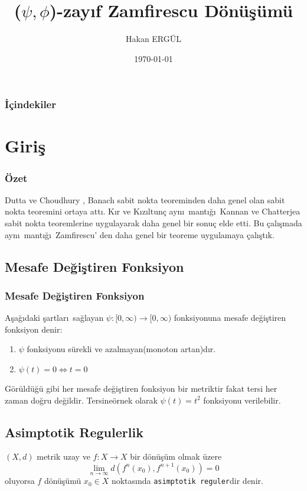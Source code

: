 \documentclass[8pt]{beamer}
\title{($\psi,\phi$)-zay\i f Zamfirescu D\"on\"u\c{s}\"um\"u}
\author{Hakan ERG\"UL}
\institute{Atat\"{u}rk \"{U}niversitesi}
\date{\today}
\begin{document}
\begin{frame}
\titlepage
\end{frame}
\begin{frame}
  \frametitle{\.{I}\c{c}indekiler}
  \tableofcontents
\end{frame}


\section{Giri\c{s}}
\begin{frame}
  \frametitle{\"Ozet}
  \textrm{Dutta ve Choudhury \cite{Dutta2008}, Banach sabit nokta teoreminden daha genel olan sabit nokta teoremini ortaya att\i . K\i r ve K\i z\i ltun\c{c} \cite{Kir2013} ayn\i \ mant\i \u{g}\i \ Kannan\cite{Kannan1969} ve Chatterjea\cite{Chatterjea1972} sabit nokta teoremlerine uygulayarak daha genel bir sonu\c{c} elde etti. Bu \c{c}al\i \c{s}mada ayn\i \ mant\i \u{g}\i \ Zamfirescu\cite{Zamfirescu1972}' den daha genel bir teoreme uygulamaya \c{c}al\i \c{s}t\i k.}
\end{frame}


\subsection{Mesafe De\u{g}i\c{s}tiren Fonksiyon}
\begin{frame}
\frametitle{Mesafe De\u{g}i\c{s}tiren Fonksiyon}
  \begin{definition}
     A\c{s}a\u{g}\i daki \c{s}artlar\i \ sa\u{g}layan $\psi:[0,\infty)\to[0,\infty)$ fonksiyonuna mesafe de\u{g}i\c{s}tiren fonksiyon denir:
     \begin{enumerate}
      \item $\psi$ fonksiyonu s\"urekli ve azalmayan(monoton artan)d\i r.
      \item $\psi(t)=0\Leftrightarrow t=0$
     \end{enumerate}
G\"or\"uld\"u\u{g}\"u gibi her mesafe de\u{g}i\c{s}tiren fonksiyon bir metriktir fakat tersi her zaman do\u{g}ru de\u{g}ildir. Tersine\"ornek olarak $\psi(t)=t^2$ fonksiyonu verilebilir.
\cite{Browder1966}
  \end{definition}
\end{frame}

\subsection{Asimptotik Regulerlik}
\begin{frame}
  \begin{definition}
     $(X,d)$ metrik uzay ve $f: X \rightarrow X$ bir d\"{o}n\"{u}\c{s}\"{u}m olmak \"uzere
     \begin{equation*}
       \lim_{n\to \infty}d(f^n(x_0),f^{n+1}(x_{0}))=0 
     \end{equation*}
oluyorsa $f$ d\"{o}n\"{u}\c{s}\"{u}m\"{u} $x_0\in X$ noktas\i nda \texttt{asimptotik reguler}dir denir.
\cite{Browder1966}
  \end{definition}
\end{frame}
\end{document}
